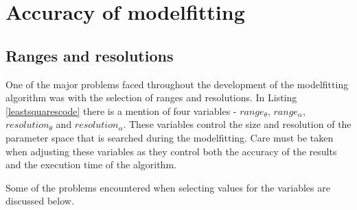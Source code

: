 \newcommand{\graphwidth}{6.2cm}


\section{Accuracy of modelfitting}

\subsection{Ranges and resolutions}

One of the major problems faced throughout the development of the modelfitting algorithm was with the selection of ranges and resolutions.
In Listing \ref{leastsquarescode} there is a mention of four variables - $range_\theta$, $range_\alpha$, $resolution_\theta$ and $resolution_\alpha$.
These variables control the size and resolution of the parameter space that is searched during the modelfitting.
Care must be taken when adjusting these variables as they control both the accuracy of the results and the execution time of the algorithm.

Some of the problems encountered when selecting values for the variables are discussed below.

